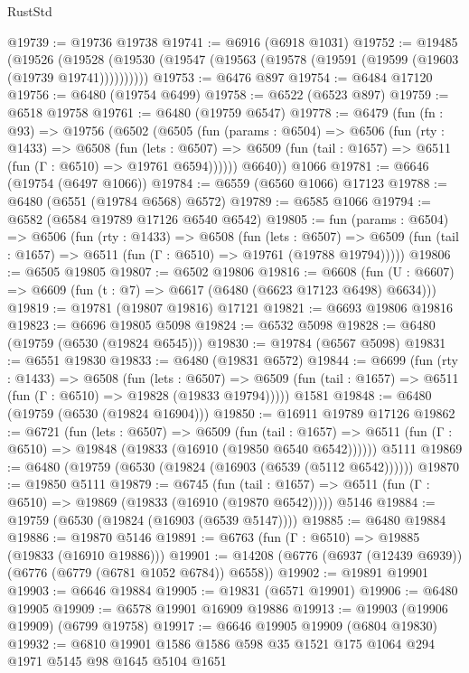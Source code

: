 \begin{lexlean}{RustStd}
\begin{coremodule}
@19739 := @19736 @19738
@19741 := @6916 (@6918 @1031)
@19752 := @19485
    (@19526 (@19528 (@19530 (@19547 (@19563 (@19578 (@19591 (@19599 (@19603 (@19739 @19741))))))))))
@19753 := @6476 @897
@19754 := @6484 @17120
@19756 := @6480 (@19754 @6499)
@19758 := @6522 (@6523 @897)
@19759 := @6518 @19758
@19761 := @6480 (@19759 @6547)
@19778 := @6479
    (fun (fn : @93) =>
    @19756
      (@6502
        (@6505
          (fun (params : @6504) =>
          @6506
            (fun (rty : @1433) =>
            @6508
              (fun (lets : @6507) =>
              @6509 (fun (tail : @1657) => @6511 (fun (Γ : @6510) => @19761 @6594))))))
        @6640))
    @1066
@19781 := @6646 (@19754 (@6497 @1066))
@19784 := @6559 (@6560 @1066) @17123
@19788 := @6480 (@6551 (@19784 @6568) @6572)
@19789 := @6585 @1066
@19794 := @6582 (@6584 @19789 @17126 @6540 @6542)
@19805 := fun (params : @6504) =>
  @6506
    (fun (rty : @1433) =>
    @6508
      (fun (lets : @6507) =>
      @6509 (fun (tail : @1657) => @6511 (fun (Γ : @6510) => @19761 (@19788 @19794)))))
@19806 := @6505 @19805
@19807 := @6502 @19806
@19816 := @6608
    (fun (U : @6607) => @6609 (fun (t : @7) => @6617 (@6480 (@6623 @17123 @6498) @6634)))
@19819 := @19781 (@19807 @19816) @17121
@19821 := @6693 @19806 @19816
@19823 := @6696 @19805 @5098
@19824 := @6532 @5098
@19828 := @6480 (@19759 (@6530 (@19824 @6545)))
@19830 := @19784 (@6567 @5098)
@19831 := @6551 @19830
@19833 := @6480 (@19831 @6572)
@19844 := @6699
    (fun (rty : @1433) =>
    @6508
      (fun (lets : @6507) =>
      @6509 (fun (tail : @1657) => @6511 (fun (Γ : @6510) => @19828 (@19833 @19794)))))
    @1581
@19848 := @6480 (@19759 (@6530 (@19824 @16904)))
@19850 := @16911 @19789 @17126
@19862 := @6721
    (fun (lets : @6507) =>
    @6509
      (fun (tail : @1657) =>
      @6511 (fun (Γ : @6510) => @19848 (@19833 (@16910 (@19850 @6540 @6542))))))
    @5111
@19869 := @6480 (@19759 (@6530 (@19824 (@16903 (@6539 (@5112 @6542))))))
@19870 := @19850 @5111
@19879 := @6745
    (fun (tail : @1657) => @6511 (fun (Γ : @6510) => @19869 (@19833 (@16910 (@19870 @6542)))))
    @5146
@19884 := @19759 (@6530 (@19824 (@16903 (@6539 @5147))))
@19885 := @6480 @19884
@19886 := @19870 @5146
@19891 := @6763 (fun (Γ : @6510) => @19885 (@19833 (@16910 @19886)))
@19901 := @14208 (@6776 (@6937 (@12439 @6939)) (@6776 (@6779 (@6781 @1052 @6784)) @6558))
@19902 := @19891 @19901
@19903 := @6646 @19884
@19905 := @19831 (@6571 @19901)
@19906 := @6480 @19905
@19909 := @6578 @19901 @16909 @19886
@19913 := @19903 (@19906 @19909) (@6799 @19758)
@19917 := @6646 @19905 @19909 (@6804 @19830)
@19932 := @6810 @19901 @1586 @1586 @598 @35 @1521 @175 @1064 @294 @1971 @5145 @98 @1645 @5104 @1651

\end{coremodule}
\end{lexlean}

